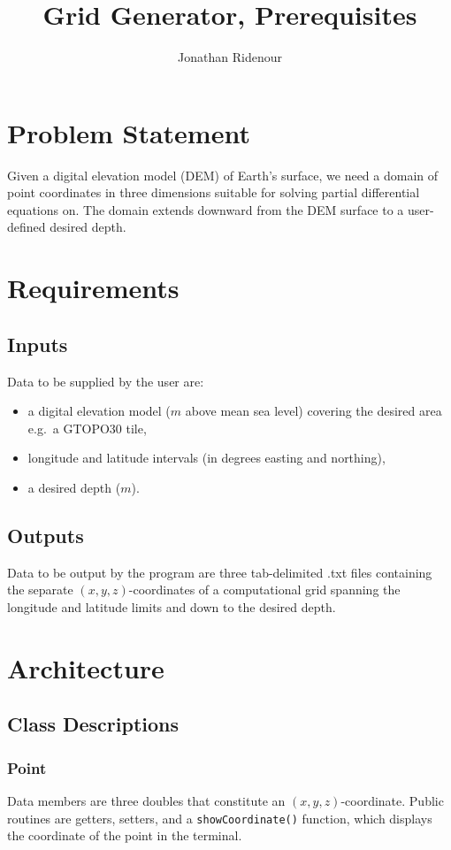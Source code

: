 \documentclass{article}
\title{Grid Generator, Prerequisites\\
}
\author{Jonathan Ridenour}
\begin{document}
\maketitle

\section{Problem Statement}
Given a digital elevation model (DEM) of Earth's surface, we need a domain of point coordinates in three dimensions suitable for solving partial differential equations on. The domain extends downward from the DEM surface to a user-defined desired depth.

\section{Requirements}

\subsection{Inputs}
Data to be supplied by the user are: 
\begin{itemize}
\item a digital elevation model ($m$ above mean sea level) covering the desired area e.g.\ a GTOPO30 tile, 
\item longitude and latitude intervals (in degrees easting and northing),
\item a desired depth ($m$).
\end{itemize}

\subsection{Outputs}
Data to be output by the program are three tab-delimited .txt files containing the separate $(x, y, z)$-coordinates of a computational grid spanning the longitude and latitude limits and down to the desired depth.

\section{Architecture}

\subsection{Class Descriptions}

\subsubsection{Point}
Data members are three doubles that constitute an $(x,y,z)$-coordinate. Public routines are getters, setters, and a \texttt{showCoordinate()} function, which displays the coordinate of the point in the terminal.
\end{document}
